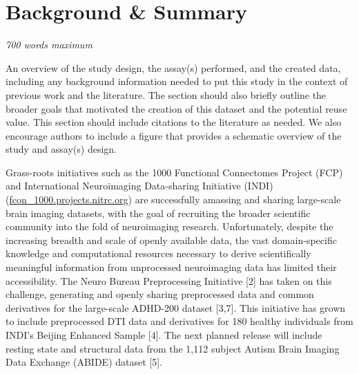 \section{Background & Summary} 
\textit{700 words maximum}

An overview of the study design, the assay(s) performed, and the created data, including any background information needed to put this study in the context of previous work and the literature. The section should also briefly outline the broader goals that motivated the creation of this dataset and the potential reuse value.  This section should include citations to the literature as needed.  We also encourage authors to include a figure that provides a schematic overview of the study and assay(s) design. 


 Grass-roots initiatives such as the 1000 Functional Connectomes Project (FCP)
		    and International Neuroimaging Data-sharing Initiative (INDI) (\href{http://fcon_1000.projects.nitrc.org}{fcon_1000.projects.nitrc.org}) are
successfully amassing and sharing large-scale brain imaging datasets, with the
goal of recruiting the broader scientific community into the fold of
neuroimaging research. Unfortunately, despite the increasing breadth and scale
of openly available data, the vast domain-specific knowledge and computational
resources necessary to derive scientifically meaningful information from
unprocessed neuroimaging data has limited their accessibility. The Neuro Bureau
Preprocessing Initiative [2] has taken on this challenge,
generating and openly sharing preprocessed data and common derivatives for the
large-scale ADHD-200 dataset [3,7]. This initiative has grown to
include preprocessed DTI data and derivatives for 180 healthy individuals from
INDI's Beijing Enhanced Sample [4]. The next planned release will
include resting state and structural data from the 1,112 subject Autism Brain
Imaging Data Exchange (ABIDE) dataset [5].